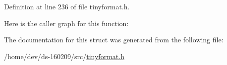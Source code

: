 Definition at line 236 of file tinyformat.\+h.



Here is the caller graph for this function\+:




The documentation for this struct was generated from the following file\+:\begin{DoxyCompactItemize}
\item 
/home/dev/ds-\/160209/src/\hyperlink{tinyformat_8h}{tinyformat.\+h}\end{DoxyCompactItemize}
